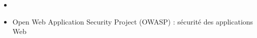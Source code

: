 \documentclass[11pt,twoside,a4paper]{article}
\begin{document}
\begin{landscape}
\begin{multicols}{2}
\begin{itemize}
\begin{itemize}
				\item 6 : correctifs...
				\item 7 : notation binaire, formatage num{\'e}rique, switch string, inf{\'e}rence types g{\'e}n{\'e}riques {\`a} la cr{\'e}ation, multicatch exceptions, java.nio (Files, Path...), autoboxing des primitifs...
				\item 8 : lambda, stream, interfaces fonctionnelles
				\item 9 : jigsaw (modularisation) ; kulla (JShell) ; JSON natif et http2
				\item 10 : inf{\'e}rence types "var", Graal / JIT plus rapide
				\item 11 : am{\'e}liorations lambda, surpression CORBA
		\end{itemize}
		\item[]
		\item Open Web Application Security Project (OWASP) : s{\'e}curit{\'e} des applications Web
	\end{itemize} %
	
	\vfill
	
	\columnbreak
	

\end{multicols}
\end{landscape}
\end{document}
